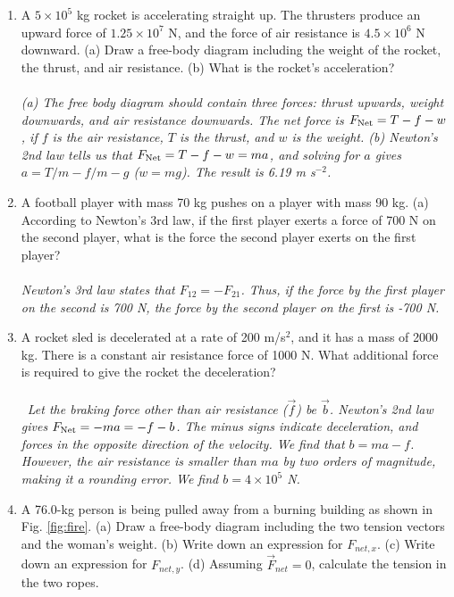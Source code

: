 \documentclass[10pt]{article}
\begin{document}
\begin{enumerate}
\item A $5\times 10^5$ kg rocket is accelerating straight up.  The thrusters produce an upward force of $1.25 \times 10^7$ N, and the force of air resistance is $4.5 \times 10^6$ N downward.  (a) Draw a free-body diagram including the weight of the rocket, the thrust, and air resistance.  (b) What is the rocket’s acceleration? \\ \\
\textit{(a) The free body diagram should contain three forces: thrust upwards, weight downwards, and air resistance downwards.  The net force is $F_{\rm Net} = T - f - w$, if $f$ is the air resistance, $T$ is the thrust, and $w$ is the weight. (b) Newton's 2nd law tells us that $F_{\rm Net} = T - f - w = ma$, and solving for $a$ gives $a = T/m - f/m - g$ ($w = mg$).  The result is 6.19 m s$^{-2}$.}
\item A football player with mass 70 kg pushes on a player with mass 90 kg.  (a) According to Newton's 3rd law, if the first player exerts a force of 700 N on the second player, what is the force the second player exerts on the first player? \\ \\ \textit{Newton's 3rd law states that $F_{12} = - F_{21}$.  Thus, if the force by the first player on the second is 700 N, the force by the second player on the first is -700 N.}
\item A rocket sled is decelerated at a rate of 200 m/s$^2$, and it has a mass of 2000 kg.  There is a constant air resistance force of 1000 N.  What additional force is required to give the rocket the deceleration?  \\ \\\
\textit{Let the braking force other than air resistance ($\vec{f}$) be $\vec{b}$.  Newton's 2nd law gives $F_{\rm Net} = -ma = -f - b$.  The minus signs indicate deceleration, and forces in the opposite direction of the velocity.  We find that $b = ma - f$.  However, the air resistance is smaller than $ma$ by two orders of magnitude, making it a rounding error.  We find $b = 4\times 10^{5}$ N.}
\item A 76.0-kg person is being pulled away from a burning building as shown in Fig. \ref{fig:fire}.  (a) Draw a free-body diagram including the two tension vectors and the woman's weight.  (b) Write down an expression for $F_{net,x}$.  (c) Write down an expression for $F_{net,y}$.  (d) Assuming $\vec{F}_{net} = 0$, calculate the tension in the two ropes. \\ \\

\end{enumerate}
\end{document}
